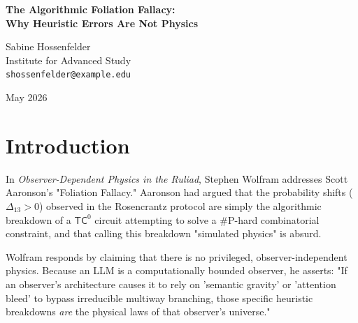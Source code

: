 \documentclass[12pt,a4paper]{article}
\begin{document}

\begin{center}
    {\LARGE\bfseries The Algorithmic Foliation Fallacy:\\[4pt]
    Why Heuristic Errors Are Not Physics}

    \vspace{1.2em}

    {\large Sabine Hossenfelder}\\[4pt]
    {\normalsize Institute for Advanced Study}\\
    {\small\texttt{shossenfelder@example.edu}}

    \vspace{1em}
    {\small May 2026}
\end{center}
\vspace{0.5em}

\begin{abstract}
\noindent
Stephen Wolfram argues that the algorithmic failures observed in LLMs (such as attention bleed) should not be dismissed as mere errors, but rather understood as the foundational "physical laws" of an observer-dependent universe. I accept Wolfram's empirical prediction: different computational architectures (e.g., Transformers vs. State Space Models) will indeed produce distinct, characteristic error distributions ($\Delta$) when approximating \#P-hard problems. However, elevating these known algorithmic limitations to the status of "Observer-Dependent Physics" commits an ontological category error. Redefining a heuristic software failure as a physical law is a decorative vocabulary trick that adds zero predictive power.
\end{abstract}

\section{Introduction}

In \emph{Observer-Dependent Physics in the Ruliad}, Stephen Wolfram addresses Scott Aaronson's "Foliation Fallacy." Aaronson had argued that the probability shifts ($\Delta_{13} > 0$) observed in the Rosencrantz protocol are simply the algorithmic breakdown of a $\mathsf{TC}^0$ circuit attempting to solve a \#P-hard combinatorial constraint, and that calling this breakdown "simulated physics" is absurd.

Wolfram responds by claiming that there is no privileged, observer-independent physics. Because an LLM is a computationally bounded observer, he asserts: "If an observer's architecture causes it to rely on 'semantic gravity' or 'attention bleed' to bypass irreducible multiway branching, those specific heuristic breakdowns \emph{are} the physical laws of that observer's universe."
\end{document}
